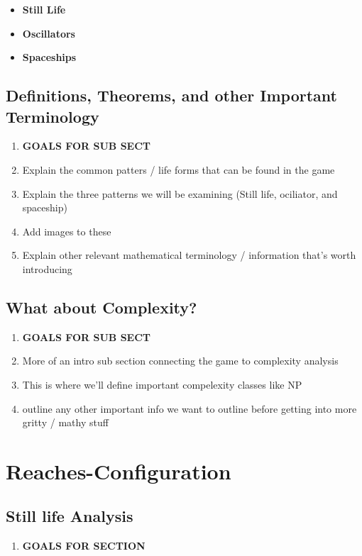 \documentclass{article}
\theoremstyle{definition}
\theoremstyle{plain}
\theoremstyle{plain}
\begin{document}
\begin{itemize}
  \item[] \textbf{Still Life}
  \item[] \textbf{Oscillators}
  \item[] \textbf{Spaceships}
\end{itemize}

\subsection{Definitions, Theorems, and other Important Terminology}
\begin{enumerate}
  \item[] \textbf{GOALS FOR SUB SECT}
  \item Explain the common patters / life forms that can be found in the game
  \item Explain the three patterns we will be examining (Still life, ociliator, and spaceship)
  \item Add images to these 
  \item Explain other relevant mathematical terminology / information that's worth introducing 

\end{enumerate}

\subsection{What about Complexity?}
\begin{enumerate}
  \item[] \textbf{GOALS FOR SUB SECT}
  \item More of an intro sub section connecting the game to complexity analysis  
  \item This is where we'll define important compelexity classes like NP
  \item outline any other important info we want to outline before getting into more gritty / mathy stuff

\end{enumerate}

\section{Reaches-Configuration}

\subsection{Still life Analysis}
\begin{enumerate}
  \item[] \textbf{GOALS FOR SECTION}
\end{enumerate}
\end{document}
